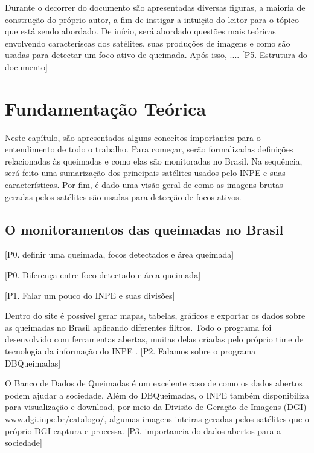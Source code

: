 \documentclass[cic,tc]{iiufrgs}
\begin{document}
Durante o decorrer do documento são apresentadas diversas figuras, a maioria de 
construção do próprio autor, a fim de instigar a intuição do leitor para o 
tópico que está sendo abordado. De início, será abordado questões mais teóricas 
envolvendo caracteríscas dos satélites, suas produções de imagens e como são 
usadas para detectar um foco ativo de queimada. Após isso, .... 
[P5. Estrutura do documento] \par



\chapter{Fundamentação Teórica}

Neste capítulo, são apresentados alguns conceitos importantes para o entendimento 
de todo o trabalho. Para começar, serão formalizadas definições relacionadas às 
queimadas e como elas são monitoradas no Brasil. Na sequência, será feito uma 
sumarização dos principais satélites usados 
pelo INPE e suas características. Por fim, é dado uma visão geral de como as 
imagens brutas geradas pelos satélites são usadas para detecção de focos ativos.\par

\section{O monitoramentos das queimadas no Brasil}


[P0. definir uma queimada, focos detectados e área queimada] \par

[P0. Diferença entre foco detectado e área queimada] \par

[P1. Falar um pouco do INPE e suas divisões] \par

Dentro do site é possível gerar mapas,
tabelas, gráficos e exportar os dados sobre as queimadas no Brasil 
aplicando diferentes filtros. Todo o programa foi desenvolvido com 
ferramentas abertas, muitas delas criadas pelo próprio time de tecnologia da 
informação do INPE \citep{setzer2019banco}. 
[P2. Falamos sobre o programa DBQueimadas] \par

O Banco de Dados de Queimadas é um excelente caso de como os dados abertos podem 
ajudar a sociedade. Além do DBQueimadas, o INPE também 
disponibiliza para visualização e download, por meio da Divisão de Geração de 
Imagens (DGI) \url{www.dgi.inpe.br/catalogo/}, algumas imagens inteiras geradas 
pelos satélites que o próprio DGI captura e processa. 
[P3. importancia do dados abertos para a sociedade] \par
\end{document}
